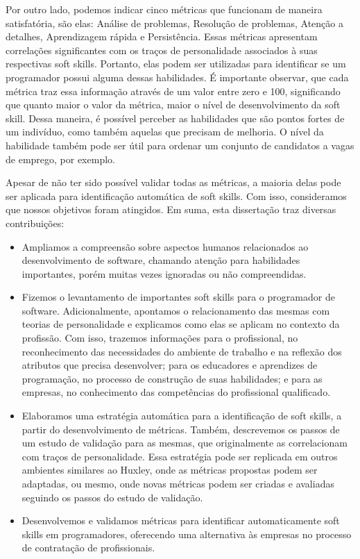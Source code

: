 Por outro lado, podemos indicar cinco métricas que funcionam de maneira satisfatória, são elas: Análise de problemas, Resolução de problemas, Atenção a detalhes, Aprendizagem rápida e Persistência. Essas métricas apresentam correlações significantes com os traços de personalidade associados à suas respectivas soft skills.
Portanto, elas podem ser utilizadas para identificar se um programador possui alguma dessas habilidades. É importante observar, que cada métrica traz essa informação através de um valor entre zero e 100, significando que quanto maior o valor da métrica, maior o nível de desenvolvimento da soft skill. Dessa maneira, é possível perceber as habilidades que são pontos fortes de um indivíduo, como também aquelas que precisam de melhoria. O nível da habilidade também pode ser útil para ordenar um conjunto de candidatos a vagas de emprego, por exemplo.

Apesar de não ter sido possível validar todas as métricas, a maioria delas pode ser aplicada para identificação automática de soft skills. Com isso, consideramos que nossos objetivos foram atingidos. Em suma, esta dissertação traz diversas contribuições:

\begin{itemize}
 \item Ampliamos a compreensão sobre aspectos humanos relacionados ao desenvolvimento de software, chamando atenção para habilidades importantes, porém muitas vezes ignoradas ou não compreendidas. 

 \item Fizemos o levantamento de importantes soft skills para o programador de software. Adicionalmente, apontamos o relacionamento das mesmas com teorias de personalidade e explicamos como elas se aplicam no contexto da profissão. Com isso, trazemos informações para o profissional, no reconhecimento das necessidades do ambiente de trabalho e na reflexão dos atributos que precisa desenvolver; para os educadores e aprendizes de programação, no processo de construção de suas habilidades; e para as empresas, no conhecimento das competências do profissional qualificado.

 \item Elaboramos uma estratégia automática para a identificação de soft skills, a partir do desenvolvimento de métricas. Também, descrevemos os passos de um estudo de validação para as mesmas, que originalmente as correlacionam com traços de personalidade.
Essa estratégia pode ser replicada em outros ambientes similares ao Huxley, onde as métricas propostas podem ser adaptadas, ou mesmo, onde novas métricas podem ser criadas e avaliadas seguindo os passos do estudo de validação.

 \item Desenvolvemos e validamos métricas para identificar automaticamente soft skills em programadores, oferecendo uma alternativa às empresas no processo de contratação de profissionais.
\end{itemize}

